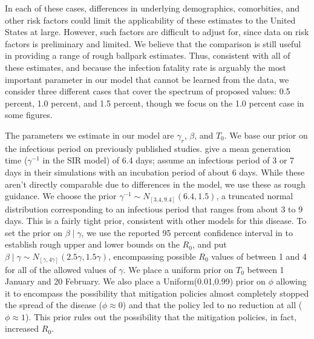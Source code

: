 \documentclass[11pt]{article}
\theoremstyle{plain}
\newcommand{\1}{\mathbf 1}
\begin{document}
In each of these cases, differences in underlying demographics, comorbities, and other risk factors could limit the applicability of these estimates to the United States at large. However, such factors are difficult to adjust for, since data on risk factors is preliminary and limited. We believe that the comparison is still useful in providing a range of rough ballpark estimates. Thus, consistent with all of these estimates, and because the infection fatality rate is arguably the most important parameter in our model that cannot be learned from the data, we consider three different cases that cover the spectrum of proposed values: 0.5 percent, 1.0 percent, and 1.5 percent, though we focus on the 1.0 percent case in some figures.


The parameters we estimate in our model are $\gamma_r$, $\beta$, and $T_0$. We base our prior on the infectious period on previously published studies. \citet{ferguson2020impact}  give a mean generation time ($\gamma^{-1}$ in the SIR model) of 6.4 days; \citet{prem2020effect} assume an infectious period of 3 or 7 days in their simulations with an incubation period of about 6 days. While these aren't directly comparable due to differences in the model, we use these as rough guidance. We choose the prior $\gamma^{-1} \sim N_{[3.4, 9.4]}(6.4, 1.5)$, a truncated normal distribution corresponding to an infectious period that ranges from about 3 to 9 days. This is a fairly tight prior, consistent with other models for this disease. To set the prior on $\beta \mid \gamma$, we use the reported 95 percent confidence interval in \cite{li2020early} to establish rough upper and lower bounds on the $R_0$, and put $\beta \mid \gamma \sim N_{[\gamma, 4\gamma]}(2.5\gamma, 1.5\gamma)$, encompassing possible $R_0$ values of between 1 and 4 for all of the allowed values of $\gamma$.  We place a uniform prior on $T_0$ between 1 January and 20 February. %
We also place a Uniform(0.01,0.99) prior on $\phi$ allowing it to encompass the possibility that mitigation policies almost completely stopped the spread of the disease ($\phi \approx 0$) and that the policy led to no reduction at all ($\phi \approx 1$). This prior rules out the possibility that the mitigation policies, in fact, increased $R_0$. 
\end{document}
